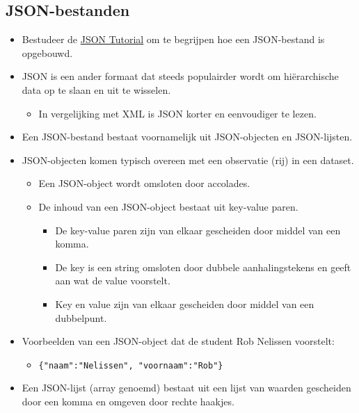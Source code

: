 \documentclass[]{memoir}
\providecommand{\tightlist}{%
  \setlength{\itemsep}{0pt}\setlength{\parskip}{0pt}}
\begin{document}
\hypertarget{json-bestanden-1}{%
\subsection{JSON-bestanden}\label{json-bestanden-1}}

\begin{itemize}
\tightlist
\item
  Bestudeer de \href{http://beginnersbook.com/2015/04/json-tutorial/}{JSON Tutorial} om te begrijpen hoe een JSON-bestand is opgebouwd.
\item
  JSON is een ander formaat dat steeds populairder wordt om hiërarchische data op te slaan en uit te wisselen.

  \begin{itemize}
  \tightlist
  \item
    In vergelijking met XML is JSON korter en eenvoudiger te lezen.
  \end{itemize}
\item
  Een JSON-bestand bestaat voornamelijk uit JSON-objecten en JSON-lijsten.
\item
  JSON-objecten komen typisch overeen met een observatie (rij) in een dataset.

  \begin{itemize}
  \tightlist
  \item
    Een JSON-object wordt omsloten door accolades.
  \item
    De inhoud van een JSON-object bestaat uit key-value paren.

    \begin{itemize}
    \tightlist
    \item
      De key-value paren zijn van elkaar gescheiden door middel van een komma.
    \item
      De key is een string omsloten door dubbele aanhalingstekens en geeft aan wat de value voorstelt.
    \item
      Key en value zijn van elkaar gescheiden door middel van een dubbelpunt.
    \end{itemize}
  \end{itemize}
\item
  Voorbeelden van een JSON-object dat de student Rob Nelissen voorstelt:

  \begin{itemize}
  \tightlist
  \item
    \texttt{\{"naam":"Nelissen",\ "voornaam":"Rob"\}}
  \end{itemize}
\item
  Een JSON-lijst (array genoemd) bestaat uit een lijst van waarden gescheiden door een komma en omgeven door rechte haakjes.


\end{itemize}
\end{document}
